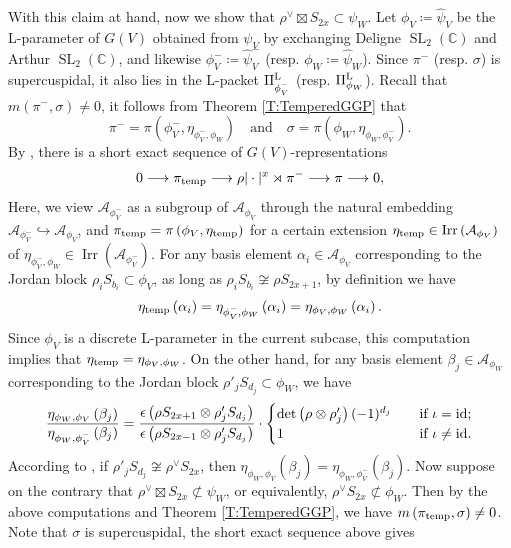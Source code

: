 \documentclass[11pt,letterpaper]{amsart}
\theoremstyle{plain}
\numberwithin{theorem}{section}
\numberwithin{equation}{subsection}
\theoremstyle{remark}
\newcommand{\SL}{\operatorname{SL}}
\newcommand{\Irr}{\operatorname{Irr}}
\newcommand{\C}{\mathbb{C}}
\def\calA{\mathcal{A}}
\def\lra{\longrightarrow}
\def\LP{\Pi^{\rm L}} %
\begin{document}
With this claim at hand, now we show that $\rho^\vee\boxtimes S_{2x}\subset \psi_W$. Let $\phi_V\coloneqq \widehat{\psi}_V$ be the L-parameter of $G\left(V\right)$ obtained from $\psi_V$ by exchanging Deligne $\SL_2(\C)$ and Arthur $\SL_2(\C)$, and likewise $\phi_V^-\coloneqq\widehat{\psi}_V^-$ (resp. $\phi_W\coloneqq \widehat{\psi}_W$). Since $\pi^-$ (resp. $\sigma$) is supercuspidal, it also lies in the L-packet $\LP_{\phi_V^-}$ (resp. $\LP_{\phi_W}$). Recall that $m\left(\pi^-,\sigma\right)\neq 0$, it follows from Theorem \ref{T:TemperedGGP} that 
\[
    \pi^- = \pi\left(\phi_V^-,\eta_{\phi_V^-,\phi_W}\right) \quad \text{and} \quad \sigma = \pi\left(\phi_W,\eta_{\phi_W,\phi_V^-}\right).
\]
By \cite[Lem. 5.1]{MR4055180}, there is a short exact sequence of $G\left(V\right)$-representations
\[
    0 \lra \pi_{\rm temp} \lra \rho|\cdot|^x\rtimes \pi^- \lra \pi \lra 0,
\]
Here, we view $\calA_{\phi_V^-}$ as a subgroup of $\calA_{\phi_V}$ through the natural embedding $\calA_{\phi_V^-}\hookrightarrow\calA_{\phi_V}$, and $\pi_{\rm temp}=\pi\left(\phi_V,\eta_{\rm temp}\right)$ for a certain extension $\eta_{\rm temp}\in\Irr\left(\calA_{\phi_V}\right)$ of $\eta_{\phi_V^-,\phi_W}\in\Irr\left(\calA_{\phi_V^-}\right)$. For any basis element $\alpha_i\in\calA_{\phi_V}$ corresponding to the Jordan block $\rho_i S_{b_i}\subset \phi_V$, as long as $\rho_i S_{b_i}\not\cong\rho S_{2x+1}$, by definition we have
\[
    \eta_{\rm temp}\left(\alpha_i\right) = \eta_{\phi_V^-,\phi_W}\left(\alpha_i\right) = \eta_{\phi_V,\phi_W}\left(\alpha_i\right).
\]
Since $\phi_V$ is a discrete L-parameter in the current subcase, this computation implies that $\eta_{\rm temp}=\eta_{\phi_V,\phi_W}$. On the other hand, for any basis element $\beta_j\in\calA_{\phi_W}$ corresponding to the Jordan block $\rho'_j S_{d_j}\subset \phi_W$, we have
\[
    \frac{\eta_{\phi_W,\phi_V}\left(\beta_j\right)}{\eta_{\phi_W,\phi_V^-}\left(\beta_j\right)} = \frac{\epsilon\left(\rho S_{2x+1}\otimes\rho'_jS_{d_j}\right)}{\epsilon\left(\rho S_{2x-1}\otimes\rho'_jS_{d_j}\right)} \cdot
    \begin{cases}
      \det\left(\rho\otimes\rho'_j\right)(-1)^{d_j} \quad & \text{if }\iota = {\rm id};\\
        1 \quad & \text{if }\iota \neq {\rm id}.
    \end{cases}
\] 
According to \cite[Lem. A.4]{MR3714507}, if $\rho'_jS_{d_j}\not\cong\rho^\vee S_{2x}$, then $\eta_{\phi_W,\phi_V}\left(\beta_j\right)=\eta_{\phi_W,\phi_V^-}\left(\beta_j\right)$. Now suppose on the contrary that $\rho^\vee\boxtimes S_{2x}\not\subset \psi_W$, or equivalently, $\rho^\vee S_{2x}\not\subset\phi_W$. Then by the above computations and Theorem \ref{T:TemperedGGP}, we have $m\left(\pi_{\rm temp},\sigma\right)\neq 0$. Note that $\sigma$ is supercuspidal, the short exact sequence above gives
\end{document}
